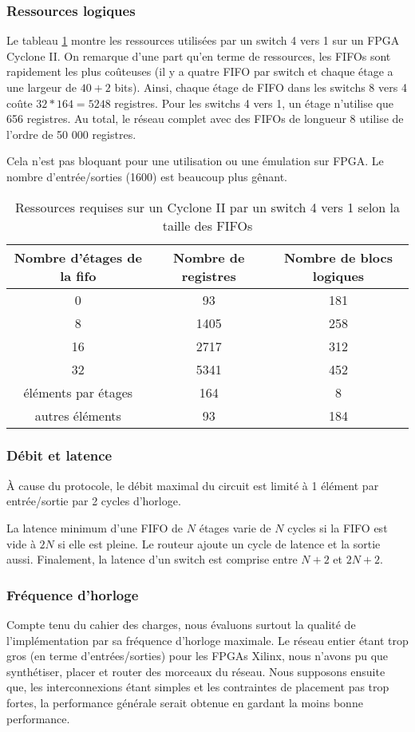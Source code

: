 \documentclass[11pt]{article}
\begin{document}
\subsubsection{Ressources logiques}
Le tableau \ref{perfs-sw-4} montre les ressources utilisées par un switch 4 vers 1 sur un FPGA Cyclone II. On remarque d'une part qu'en terme de ressources, les FIFOs sont rapidement les plus coûteuses (il y a quatre FIFO par switch et chaque étage a une largeur de $40+2$ bits). Ainsi, chaque étage de FIFO dans les switchs 8 vers 4 coûte $32*164=5248$ registres. Pour les switchs 4 vers 1, un étage n'utilise que 656 registres. Au total, le réseau complet avec des FIFOs de longueur 8 utilise de l'ordre de 50 000 registres.

Cela n'est pas bloquant pour une utilisation ou une émulation sur FPGA. Le nombre d'entrée/sorties (1600) est beaucoup plus gênant.

\begin{table}
\centering
\begin{tabular}{|c|c|c|}
\hline
Nombre d'étages de la fifo & Nombre de registres & Nombre de blocs logiques \\
\hline
0 & 93 & 181 \\
8 & 1405 & 258 \\
16 &  2717 & 312 \\
32 & 5341 & 452 \\
\hline \hline
éléments par étages & 164 & 8 \\
autres éléments & 93 & 184 \\
\hline
\end{tabular}
\caption{Ressources requises sur un Cyclone II par un switch 4 vers 1 selon la taille des FIFOs}
\label{perfs-sw-4}
\end{table}

\subsubsection{Débit et latence}
\`A cause du protocole, le débit maximal du circuit est limité à 1 élément par entrée/sortie par 2 cycles d'horloge.

La latence minimum d'une FIFO de $N$ étages varie de $N$ cycles si la FIFO est vide à $2N$ si elle est pleine. Le routeur ajoute un cycle de latence et la sortie aussi. Finalement, la latence d'un switch est comprise entre $N+2$ et $2N+2$.

\subsubsection{Fréquence d'horloge}
Compte tenu du cahier des charges, nous évaluons surtout la qualité de l'implémentation par sa fréquence d'horloge maximale. Le réseau entier étant trop gros (en terme d'entrées/sorties) pour les FPGAs Xilinx, nous n'avons pu que synthétiser, placer et router des morceaux du réseau. Nous supposons ensuite que, les interconnexions étant simples et les contraintes de placement pas trop fortes, la performance générale serait obtenue en gardant la moins bonne performance.
\end{document}
